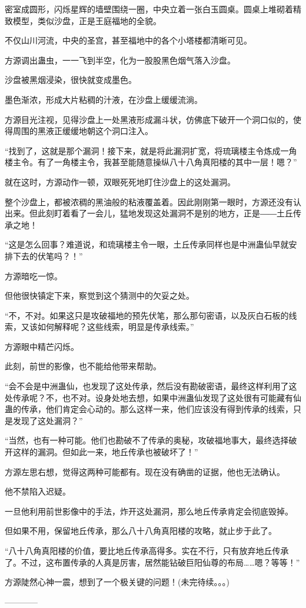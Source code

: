 \begin{this_body}
密室成圆形，闪烁星辉的墙壁围绕一圈，中央立着一张白玉圆桌。圆桌上堆砌着精致模型，类似沙盘，正是王庭福地的全貌。

不仅山川河流，中央的圣宫，甚至福地中的各个小塔楼都清晰可见。

方源调出蛊虫，一一飞到半空，化为一股股黑色烟气落入沙盘。

沙盘被黑烟浸染，很快就变成墨色。

墨色渐浓，形成大片粘稠的汁液，在沙盘上缓缓流淌。

方源目光注视，见得沙盘上一处黑液形成漏斗状，仿佛底下破开一个洞口似的，使得周围的黑液正缓缓地朝这个洞口注入。

“找到了，这就是那个漏洞！接下来，就是将此漏洞扩宽，将琉璃楼主令炼成一角楼主令。有了一角楼主令，我甚至能随意操纵八十八角真阳楼的其中一层！嗯？”

就在这时，方源动作一顿，双眼死死地盯住沙盘上的这处漏洞。

整个沙盘上，都被浓稠的黑油般的粘液覆盖着。因此刚刚第一眼时，方源还没有认出来。但此刻盯着看了一会儿，猛地发现这处漏洞不是别的地方，正是――土丘传承之地！

“这是怎么回事？难道说，和琉璃楼主令一眼，土丘传承同样也是中洲蛊仙早就安排下去的伏笔吗？！”

方源暗吃一惊。

但他很快镇定下来，察觉到这个猜测中的欠妥之处。

“不，不对。如果这只是攻破福地的预先伏笔，那么那句密语，以及灰白石板的线索，又该如何解释呢？这些线索，明显是传承线索。”

方源眼中精芒闪烁。

此刻，前世的影像，也不能给他带来帮助。

“会不会是中洲蛊仙，也发现了这处传承，然后没有勘破密语，最终这样利用了这处传承呢？不，也不对。设身处地去想，如果中洲蛊仙发现了这处很有可能藏有仙蛊的传承，他们肯定会心动的。那么这样一来，他们应该没有得到传承的线索，只是发现了这处漏洞？”

“当然，也有一种可能。他们也勘破不了传承的奥秘，攻破福地事大，最终选择破开这样的漏洞。但如此一来，地丘传承也被破坏了！”

方源左思右想，觉得这两种可能都有。现在没有确凿的证据，他也无法确认。

他不禁陷入迟疑。

一旦他利用前世影像中的手法，炸开这处漏洞，那么地丘传承肯定会彻底毁掉。

但如果不用，保留地丘传承，那么八十八角真阳楼的攻略，就止步于此了。

“八十八角真阳楼的价值，要比地丘传承高得多。实在不行，只有放弃地丘传承了。不过，这布置传承的人真是厉害，居然能钻破巨阳仙尊的布局……嗯？等等！”

方源陡然心神一震，想到了一个极关键的问题！(未完待续。。。)

------------

\end{this_body}

